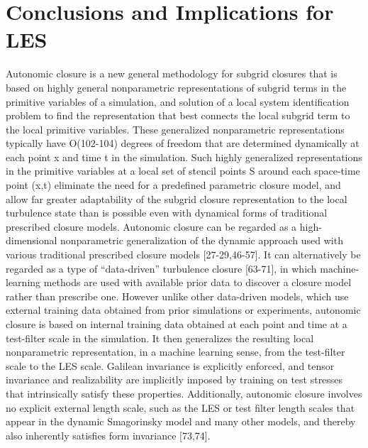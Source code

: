 \graphicspath{ {./Ch7/}  } 

\chapter{Conclusions and Implications for LES}

Autonomic closure is a new general methodology for subgrid closures that is based on highly general nonparametric representations of subgrid terms in the primitive variables of a simulation, and solution of a local system identification problem to find the representation that best connects the local subgrid term to the local primitive variables. These generalized nonparametric representations typically have O(102-104) degrees of freedom that are determined dynamically at each point x and time t in the simulation. Such highly generalized representations in the primitive variables at a local set of stencil points S around each space-time point (x,t) eliminate the need for a predefined parametric closure model, and allow far greater adaptability of the subgrid closure representation to the local turbulence state than is possible even with dynamical forms of traditional prescribed closure models. 
Autonomic closure can be regarded as a high-dimensional nonparametric generalization of the dynamic approach used with various traditional prescribed closure models [27-29,46-57]. It can alternatively be regarded as a type of “data-driven” turbulence closure [63-71], in which machine-learning methods are used with available prior data to discover a closure model rather than prescribe one. However unlike other data-driven models, which use external training data obtained from prior simulations or experiments, autonomic closure is based on internal training data obtained at each point and time at a test-filter scale in the simulation. It then generalizes the resulting local nonparametric representation, in a machine learning sense, from the test-filter scale to the LES scale. Galilean invariance is explicitly enforced, and tensor invariance and realizability are implicitly imposed by training on test stresses   that intrinsically satisfy these properties. Additionally, autonomic closure involves no explicit external length scale, such as the LES or test filter length scales that appear in the dynamic Smagorinsky model and many other models, and thereby also inherently satisfies form invariance [73,74].

